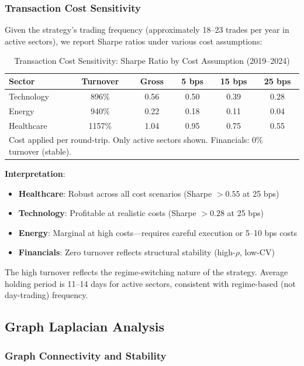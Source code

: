 \subsubsection{Transaction Cost Sensitivity}

Given the strategy's trading frequency (approximately 18--23 trades per year in active sectors), we report Sharpe ratios under various cost assumptions:

\begin{table}[H]
\centering
\small
\caption{Transaction Cost Sensitivity: Sharpe Ratio by Cost Assumption (2019--2024)}
\label{tab:cost-sensitivity}
\begin{tabular}{@{}lccccc@{}}
\toprule
\textbf{Sector} & \textbf{Turnover} & \textbf{Gross} & \textbf{5 bps} & \textbf{15 bps} & \textbf{25 bps} \\
\midrule
Technology & 896\% & 0.56 & 0.50 & 0.39 & 0.28 \\
Energy & 940\% & 0.22 & 0.18 & 0.11 & 0.04 \\
Healthcare & 1157\% & 1.04 & 0.95 & 0.75 & 0.55 \\
\bottomrule
\multicolumn{6}{l}{\footnotesize Cost applied per round-trip. Only active sectors shown. Financials: 0\% turnover (stable).}
\end{tabular}
\end{table}

\textbf{Interpretation}:
\begin{itemize}
    \item \textbf{Healthcare}: Robust across all cost scenarios (Sharpe $> 0.55$ at 25 bps)
    \item \textbf{Technology}: Profitable at realistic costs (Sharpe $> 0.28$ at 25 bps)
    \item \textbf{Energy}: Marginal at high costs---requires careful execution or 5--10 bps costs
    \item \textbf{Financials}: Zero turnover reflects structural stability (high-$\rho$, low-CV)
\end{itemize}

The high turnover reflects the regime-switching nature of the strategy. Average holding period is 11--14 days for active sectors, consistent with regime-based (not day-trading) frequency.

\subsection{Graph Laplacian Analysis}

\subsubsection{Graph Connectivity and Stability}

